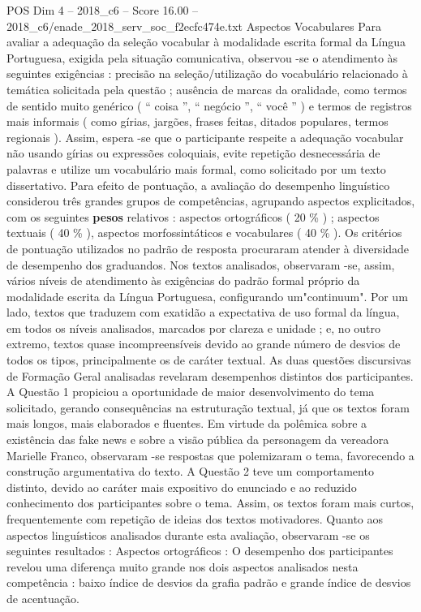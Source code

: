 \begin{textsample}{POS Dim 4 – 2018\_c6 – Score 16.00 – 2018\_c6/enade\_2018\_serv\_soc\_f2ecfc474e.txt}
Aspectos Vocabulares Para avaliar a adequação da seleção vocabular à modalidade escrita formal da Língua Portuguesa, exigida pela situação comunicativa, observou -se o atendimento às seguintes exigências : precisão na seleção/utilização do vocabulário relacionado à temática solicitada pela questão ; ausência de marcas da oralidade, como termos de sentido muito genérico ( “ coisa ”, “ negócio ”, “ você ” ) e termos de registros mais informais ( como gírias, jargões, frases feitas, ditados populares, termos regionais ).
Assim, espera -se que o participante respeite a adequação vocabular não usando gírias ou expressões coloquiais, evite repetição desnecessária de palavras e utilize um vocabulário mais formal, como solicitado por um texto dissertativo.
Para efeito de pontuação, a avaliação do desempenho linguístico considerou três grandes grupos de competências, agrupando aspectos explicitados, com os seguintes \textbf{pesos} relativos : aspectos ortográficos ( 20 \% ) ; aspectos textuais ( 40 \% ), aspectos morfossintáticos e vocabulares ( 40 \% ).
Os critérios de pontuação utilizados no padrão de resposta procuraram atender à diversidade de desempenho dos graduandos.
Nos textos analisados, observaram -se, assim, vários níveis de atendimento às exigências do padrão formal próprio da modalidade escrita da Língua Portuguesa, configurando um"continuum".
Por um lado, textos que traduzem com exatidão a expectativa de uso formal da língua, em todos os níveis analisados, marcados por clareza e unidade ; e, no outro extremo, textos quase incompreensíveis devido ao grande número de desvios de todos os tipos, principalmente os de caráter textual.
As duas questões discursivas de Formação Geral analisadas revelaram desempenhos distintos dos participantes.
A Questão 1 propiciou a oportunidade de maior desenvolvimento do tema solicitado, gerando consequências na estruturação textual, já que os textos foram mais longos, mais elaborados e fluentes.
Em virtude da polêmica sobre a existência das fake news e sobre a visão pública da personagem da vereadora Marielle Franco, observaram -se respostas que polemizaram o tema, favorecendo a construção argumentativa do texto.
A Questão 2 teve um comportamento distinto, devido ao caráter mais expositivo do enunciado e ao reduzido conhecimento dos participantes sobre o tema.
Assim, os textos foram mais curtos, frequentemente com repetição de ideias dos textos motivadores.
Quanto aos aspectos linguísticos analisados durante esta avaliação, observaram -se os seguintes resultados : Aspectos ortográficos : O desempenho dos participantes revelou uma diferença muito grande nos dois aspectos analisados nesta competência : baixo índice de desvios da grafia padrão e grande índice de desvios de acentuação.

\end{textsample}

